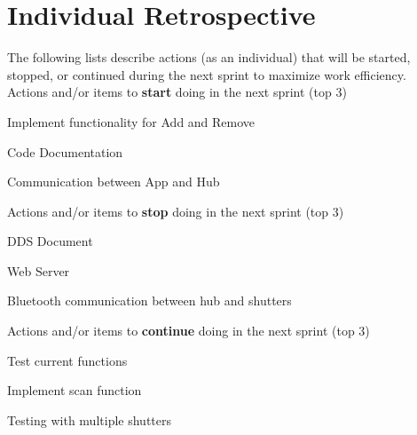 \documentclass{article}
\begin{document}
\pagebreak

\section{Individual Retrospective}
The following lists describe actions (as an individual) that will be started, stopped, or continued during the next sprint to maximize work efficiency. \\

Actions and/or items to \textbf{start} doing in the next sprint (top 3)
\begin{itemize}
\begin{item}
Implement functionality for Add and Remove
\end{item}
\begin{item}
Code Documentation
\end{item}
\begin{item}
Communication between App and Hub
\end{item}
\end{itemize}

Actions and/or items to \textbf{stop} doing in the next sprint (top 3)
\begin{itemize}
\begin{item}
DDS Document
\end{item}
\begin{item}
Web Server
\end{item}
\begin{item}
Bluetooth communication between hub and shutters
\end{item}
\end{itemize}

Actions and/or items to \textbf{continue} doing in the next sprint (top 3)
\begin{itemize}
\begin{item}
Test current functions
\end{item}
\begin{item}
Implement scan function
\end{item}
\begin{item}
Testing with multiple shutters
\end{item}
\end{itemize}
\end{document}
